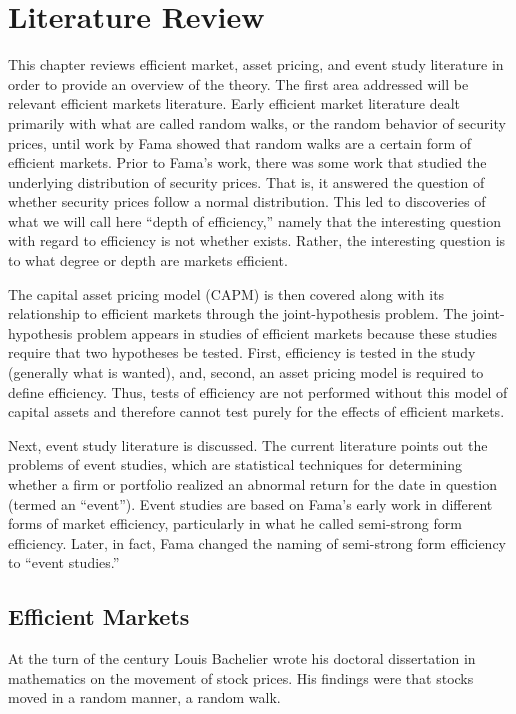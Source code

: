 \chapter{Literature Review}\label{litrev}

This chapter reviews efficient market, asset pricing, and
event study literature in order to provide an overview of
the theory.
The first area addressed will be relevant efficient markets
literature. Early efficient market literature dealt
primarily with what are called random walks, or the random
behavior of security prices, until work by Fama showed that
random walks are a certain form of efficient markets.
Prior to Fama's work, there was some work that studied the
underlying distribution of security prices.
That is, it answered the question of whether security prices
follow a normal distribution.
This led to discoveries of what we will call here ``depth of
efficiency,'' namely that the interesting question with
regard to efficiency is not whether exists.
Rather, the interesting question is to what degree or depth
are markets efficient.

The capital asset pricing model (CAPM) is then covered along
with its relationship to efficient markets through the
joint-hypothesis problem.  The joint-hypothesis problem
appears in studies of efficient markets because these studies
require that two hypotheses be tested. 
First, efficiency is tested in the study (generally what is
wanted), and, second,  an asset pricing model is required to define
efficiency.  Thus, tests of efficiency
are not performed without this model of capital assets and therefore
cannot test purely for the effects of efficient markets.

Next, event study literature is discussed.
The current literature points out the problems of event
studies, which are statistical techniques for determining
whether a firm or portfolio realized an abnormal return
for the date in question
(termed an ``event'').
Event studies are based on Fama's early work in different
forms of market efficiency, particularly in what he called
semi-strong form efficiency.
Later, in fact, Fama changed the naming of semi-strong form
efficiency to ``event studies.''

\section{Efficient Markets}

At the turn of the century Louis Bachelier \cite{bachelier}
wrote his doctoral
dissertation in mathematics on the movement of stock prices.  His
findings were that stocks moved in a random manner, a random walk.

